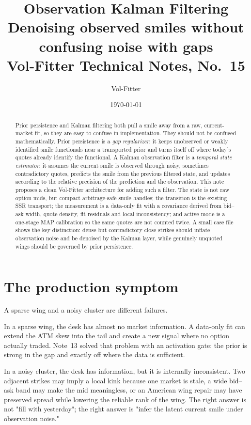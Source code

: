\documentclass[11pt]{article}
\title{\textbf{Observation Kalman Filtering}\\[2pt]
\large Denoising observed smiles without confusing noise with gaps\\[2pt]
\normalsize Vol-Fitter Technical Notes, No.~15}
\author{Vol-Fitter}
\date{\today}
\begin{document}
\maketitle

\begin{abstract}
Prior persistence and Kalman filtering both pull a smile away from a raw,
current-market fit, so they are easy to confuse in implementation. They should
not be confused mathematically. Prior persistence is a \emph{gap regularizer}: it
keeps unobserved or weakly identified smile functionals near a transported prior
and turns itself off where today's quotes already identify the functional. A
Kalman observation filter is a \emph{temporal state estimator}: it assumes the
current smile is observed through noisy, sometimes contradictory quotes, predicts
the smile from the previous filtered state, and updates according to the
relative precision of the prediction and the observation. This note proposes a
clean Vol-Fitter architecture for adding such a filter. The state is not raw
option mids, but compact arbitrage-safe smile handles; the transition is the
existing SSR transport; the measurement is a data-only fit with a covariance
derived from bid--ask width, quote density, fit residuals and local
inconsistency; and active mode is a one-stage MAP calibration so the same quotes
are not counted twice. A small case file shows the key distinction: dense but
contradictory close strikes should inflate observation noise and be denoised by
the Kalman layer, while genuinely unquoted wings should be governed by prior
persistence.
\end{abstract}

\tableofcontents
\newpage

\section{The production symptom}
\label{sec:symptom}

A sparse wing and a noisy cluster are different failures.

In a sparse wing, the desk has almost no market information. A data-only fit can
extend the ATM skew into the tail and create a new signal where no option
actually traded. Note~13 solved that problem with an activation gate: the prior
is strong in the gap and exactly off where the data is sufficient.

In a noisy cluster, the desk has information, but it is internally inconsistent.
Two adjacent strikes may imply a local kink because one market is stale, a wide
bid--ask band may make the mid meaningless, or an American wing repair may have
preserved spread while lowering the reliable rank of the wing. The right answer
is not "fill with yesterday"; the right answer is "infer the latent current
smile under observation noise."
\end{document}
